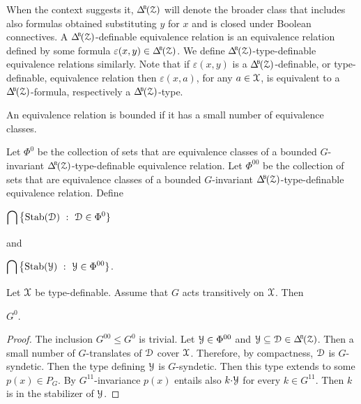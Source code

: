 When the context suggests it, $\BDelta(\Z)$ will denote the broader class that includes also formulas obtained substituting $y$ for $x$ and is closed under Boolean connectives.
A $\BDelta(\Z)$-definable equivalence relation is an equivalence relation defined by some formula $\varepsilon(x,y)\in\BDelta(\Z)$.
We define $\BDelta(\Z)$-type-definable equivalence relations similarly.
Note that if $\varepsilon(x,y)$ is a $\BDelta(\Z)$-definable, or type-definable, equivalence relation then $\varepsilon(x,a)$, for any $a\in\EuScript X$, is equivalent to a $\BDelta(\Z)$-formula, respectively a $\BDelta(\Z)$-type.

An equivalence relation is bounded if it has a small number of equivalence classes.

\begin{definition}\label{def_G00}
  Let $\Phi^0$ be the collection of sets that are equivalence classes of a bounded $G$-invariant $\BDelta(\Z)$-type-definable equivalence relation.
  Let $\Phi^{00}$ be the collection of sets that are equivalence classes of a bounded $G$-invariant $\BDelta(\Z)$-type-definable equivalence relation.
  Define
  \smallskip

  \medrel{=}$\displaystyle\bigcap\big\{{\rm Stab}(\D)\ :\  \D\in\Phi^0\}$

  and

  \medrel{=}$\displaystyle\bigcap\big\{{\rm Stab}(\Y)\ :\  \Y\in\Phi^{00}\}$.

\end{definition}

\begin{proposition}
  Let $\EuScript X$ be type-definable.
  Assume that $G$ acts transitively on $\EuScript X$.
  Then 
  
  \medrel{\leq}$G^0$.
\end{proposition}

\begin{proof}
  The inclusion $G^{00}\leq G^0$ is trivial.
  Let $\EuScript Y\in\Phi^{00}$ and $\Y\subseteq\D\in\BDelta(\Z)$.
  Then a small number of $G$-translates of $\EuScript D$ cover $\EuScript X$.
  Therefore, by compactness, $\EuScript D$ is $G$-syndetic.
  Then the type defining $\EuScript Y$ is $G$-syndetic.
  Then this type extends to some $p(x)\in P_G$.
  By $G^{1\!1}$-in\-variance $p(x)$ entails also $k{\cdot}\EuScript Y$ for every $k\in G^{1\!1}$.
  Then $k$ is in the stabilizer of $\EuScript Y$.
\end{proof}



